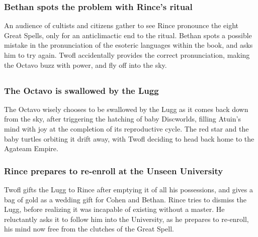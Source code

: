 \subsubsection{\Gls{Bethan} spots the problem with \Gls{Rince}'s ritual}
An audience of cultists and citizens gather to see \Gls{Rince} pronounce the eight Great Spells,
only for an anticlimactic end to the ritual. \Gls{Bethan} spots a possible mistake in the
pronunciation of the esoteric languages within the book, and asks him to try again. \Gls{Twofl}
accidentally provides the correct pronunciation, making the Octavo buzz with power, and fly off into
the sky.

\subsection{}
\subsubsection{The Octavo is swallowed by the \Gls{Lugg}}
The Octavo wisely chooses to be swallowed by the \Gls{Lugg} as it comes back down from the sky,
after triggering the hatching of baby Discworlds, filling \Gls{Atuin}'s mind with joy at the
completion of its reproductive cycle. The red star and the baby turtles orbiting it drift away,
with \Gls{Twofl} deciding to head back home to the Agateam Empire.

\subsubsection{\Gls{Rince} prepares to re-enroll at the Unseen University}
\Gls{Twofl} gifts the \Gls{Lugg} to \Gls{Rince} after emptying it of all his possessions, and gives
a bag of gold as a wedding gift for \Gls{Cohen} and \Gls{Bethan}. \Gls{Rince} tries to dismiss the
\Gls{Lugg}, before realizing it was incapable of existing without a master. He reluctantly asks it
to follow him into the University, as he prepares to re-enroll, his mind now free from the clutches
of the Great Spell.